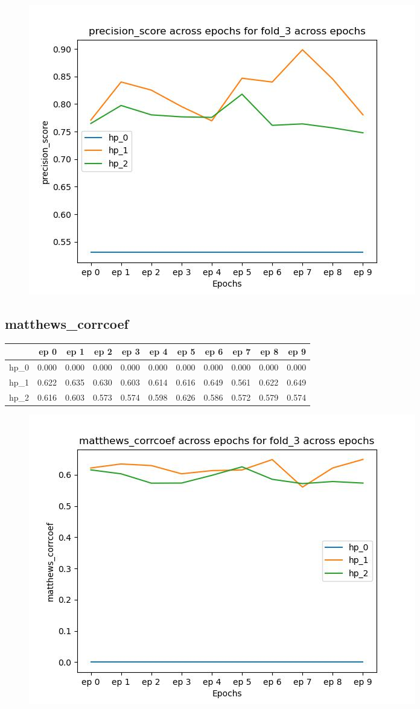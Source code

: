 \documentclass{article}
\begin{document}
\begin{figure}[H]
\includegraphics[scale = 0.75]{fold_3/precision_score}
\end{figure}
\subsection{matthews\_corrcoef}
\begin{tabular}{lrrrrrrrrrr}
\toprule
{} &   ep 0 &   ep 1 &   ep 2 &   ep 3 &   ep 4 &   ep 5 &   ep 6 &   ep 7 &   ep 8 &   ep 9 \\
\midrule
hp\_0 &  0.000 &  0.000 &  0.000 &  0.000 &  0.000 &  0.000 &  0.000 &  0.000 &  0.000 &  0.000 \\
hp\_1 &  0.622 &  0.635 &  0.630 &  0.603 &  0.614 &  0.616 &  0.649 &  0.561 &  0.622 &  0.649 \\
hp\_2 &  0.616 &  0.603 &  0.573 &  0.574 &  0.598 &  0.626 &  0.586 &  0.572 &  0.579 &  0.574 \\
\bottomrule
\end{tabular}

\begin{figure}[H]
\includegraphics[scale = 0.75]{fold_3/matthews_corrcoef}
\end{figure}
\end{document}
